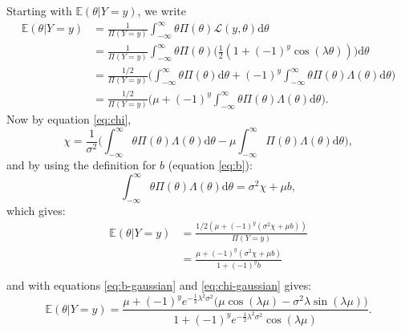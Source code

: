 \documentclass[]{report}
\begin{document}
Starting with $\mathbb{E}(\theta | Y=y)$, we write
\begin{align}
    \mathbb{E}(\theta | Y=y) &= \frac{1}{\Pi(Y=y)} \int_{-\infty}^{\infty} \theta \Pi(\theta)\mathcal{L}(y, \theta)\text{d}\theta\\
    &= \frac{1}{\Pi(Y=y)} \int_{-\infty}^{\infty} \theta \Pi(\theta)\Big(\frac{1}{2}(1 + (-1)^{y} \cos(\lambda \theta))\Big)\text{d}\theta\\
    &= \frac{1/2}{\Pi(Y=y)} \Bigg(\int_{-\infty}^{\infty}\theta\Pi(\theta)\text{d}\theta + (-1)^y \int_{-\infty}^{\infty}\theta\Pi(\theta)\Lambda(\theta)\text{d}\theta\Bigg)\\
    &= \frac{1/2}{\Pi(Y=y)} \Bigg(\mu + (-1)^y \int_{-\infty}^{\infty}\theta\Pi(\theta)\Lambda(\theta)\text{d}\theta\Bigg).
\end{align}
Now by equation \eqref{eq:chi},
\begin{equation}
    \chi = \frac{1}{\sigma^2}\Bigg( \int_{-\infty}^{\infty} \theta\Pi(\theta)\Lambda(\theta)\text{d}\theta - \mu \int_{-\infty}^{\infty} \Pi(\theta)\Lambda(\theta)\text{d}\theta\Bigg),
\end{equation}
and by using the definition for $b$ (equation \eqref{eq:b}):
\begin{equation}
    \int_{-\infty}^{\infty} \theta\Pi(\theta)\Lambda(\theta)\text{d}\theta = \sigma^2\chi + \mu b,
\end{equation}
which gives:
\begin{align}
    \mathbb{E}(\theta | Y=y) &= \frac{1/2(\mu + (-1)^y(\sigma^2\chi + \mu b))}{\Pi(Y=y)}\\
    &= \frac{\mu + (-1)^y(\sigma^2\chi + \mu b)}{1+(-1)^yb}\\
\end{align}
and with equations \eqref{eq:b-gaussian} and \eqref{eq:chi-gaussian} gives:
\begin{equation}
    \mathbb{E}(\theta | Y=y) = \frac{\mu + (-1)^ye^{-\frac{1}{2}\lambda^2\sigma^2}\big(\mu\cos(\lambda\mu) - \sigma^2\lambda \sin(\lambda\mu)\big)}{1+(-1)^ye^{-\frac{1}{2}\lambda^2\sigma^2}\cos(\lambda\mu)}.
\end{equation}
\end{document}
